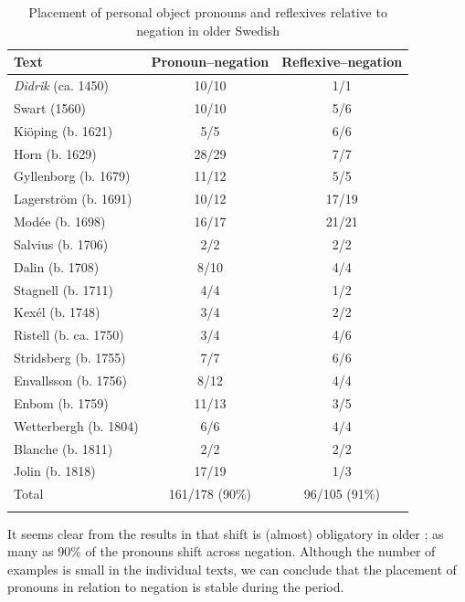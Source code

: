 \documentclass[output=paper]{langscibook}
\begin{document}
\begin{table}
\caption{Placement of personal object pronouns and reflexives relative to negation in older Swedish\label{tab:lalu:4}}
\begin{tabular}{lcc}
\lsptoprule
Text & Pronoun–negation & Reflexive--negation\\
\midrule
\textit{Didrik} (ca. 1450) & 10/10 & 1/1\\
Swart (1560) & 10/10 & 5/6\\
Kiöping (b. 1621) & 5/5 & 6/6\\
Horn (b. 1629) & 28/29 & 7/7\\
Gyllenborg (b. 1679) & 11/12 & 5/5\\
Lagerström (b. 1691) & 10/12 & 17/19\\
Modée (b. 1698) & 16/17 & 21/21\\
Salvius (b. 1706) & 2/2 & 2/2\\
Dalin (b. 1708) & 8/10 & 4/4\\
Stagnell (b. 1711) & 4/4 & 1/2\\
Kexél (b. 1748) & 3/4 & 2/2\\
Ristell (b. ca. 1750) & 3/4 & 4/6\\
Stridsberg (b. 1755) & 7/7 & 6/6\\
Envallsson (b. 1756) & 8/12 & 4/4\\
Enbom (b. 1759) & 11/13 & 3/5\\
Wetterbergh (b. 1804) & 6/6 & 4/4\\
Blanche (b. 1811) & 2/2 & 2/2\\
Jolin (b. 1818) & 17/19 & 1/3\\
\midrule
Total & 161/178 (90\%) & 96/105 (91\%)\\
\lspbottomrule
\end{tabular}
\end{table}

It seems clear from the results in  that  shift is (almost) obligatory in older ; as many as 90\% of the pronouns shift across negation. Although the number of examples is small in the individual texts, we can conclude that the placement of pronouns in relation to negation is stable during the period.
\end{document}

